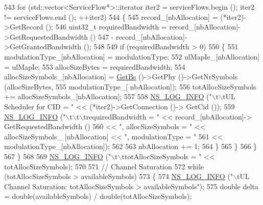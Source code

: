 \begin{DoxyCode}
543           \textcolor{keywordflow}{for} (std::vector<ServiceFlow*>::iterator iter2 = serviceFlows.begin (); iter2 != serviceFlows.end
       (); ++iter2)
544             \{
545               record\_[nbAllocation] = (*iter2)->GetRecord ();
546               uint32\_t requiredBandwidth = record\_[nbAllocation]->GetRequestedBandwidth ()
547                 - record\_[nbAllocation]->GetGrantedBandwidth ();
548 
549               \textcolor{keywordflow}{if} (requiredBandwidth > 0)
550                 \{
551                   modulationType\_[nbAllocation] = modulationType;
552                   ulMapIe\_[nbAllocation] = ulMapIe;
553                   allocSizeBytes = requiredBandwidth;
554                   allocSizeSymbols\_[nbAllocation] = \hyperlink{classns3_1_1UplinkScheduler_afe61b7de71d92d2dff1b135744a6ff7e}{GetBs} ()->GetPhy ()->GetNrSymbols (allocSizeBytes,
555                                                                                        modulationType\_[
      nbAllocation]);
556                   totAllocSizeSymbols += allocSizeSymbols\_[nbAllocation];
557 
558                   \hyperlink{group__logging_gafbd73ee2cf9f26b319f49086d8e860fb}{NS\_LOG\_INFO} (\textcolor{stringliteral}{"\(\backslash\)t\(\backslash\)tUL Scheduler for CID = "} << (*iter2)->GetConnection ()->
      GetCid ());
559                   \hyperlink{group__logging_gafbd73ee2cf9f26b319f49086d8e860fb}{NS\_LOG\_INFO} (\textcolor{stringliteral}{"\(\backslash\)t\(\backslash\)t\(\backslash\)trequiredBandwidth = "} << record\_[nbAllocation]->
      GetRequestedBandwidth ()
560                                                             << \textcolor{stringliteral}{", allocSizeSymbols = "} << allocSizeSymbols\_
      [nbAllocation] << \textcolor{stringliteral}{", modulationType = "}
561                                                             << modulationType\_[nbAllocation]);
562 
563                   nbAllocation += 1;
564                 \}
565             \}
566         \}
567     \}
568 
569   \hyperlink{group__logging_gafbd73ee2cf9f26b319f49086d8e860fb}{NS\_LOG\_INFO} (\textcolor{stringliteral}{"\(\backslash\)t\(\backslash\)ttotAllocSizeSymbols = "} << totAllocSizeSymbols);
570 
571   \textcolor{comment}{// Channel Saturation}
572   \textcolor{keywordflow}{while} (totAllocSizeSymbols > availableSymbols)
573     \{
574       \hyperlink{group__logging_gafbd73ee2cf9f26b319f49086d8e860fb}{NS\_LOG\_INFO} (\textcolor{stringliteral}{"\(\backslash\)tUL Channel Saturation: totAllocSizeSymbols > availableSymbols"});
575       \textcolor{keywordtype}{double} delta = double(availableSymbols) / double(totAllocSizeSymbols);

\end{DoxyCode}
